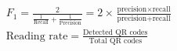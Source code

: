 \documentclass[../main.tex]{subfiles}
\begin{document}
\begin{align}
    F_1 = \frac{2}{ \frac{1}{\text{Recall}} + \frac{1}{\text{Precision}} }
    = 2 \times \frac{\text{precision} \times
    \text{recall}}{\text{precision} + \text{recall}}
    \label{eq:f1} \\
    \text{Reading rate} = \frac{\text{Detected QR codes}}{\text{Total QR codes}}
    \label{eq:reading-rate}
\end{align}
\end{document}
